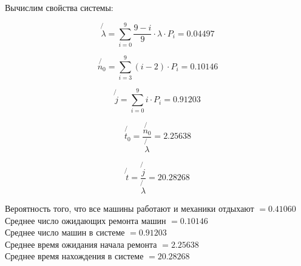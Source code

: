 Вычислим свойства системы:

\begin{equation*}
	\not{\lambda} = \sum_{i = 0}^9 \frac{9 - i}{9} \cdot \lambda \cdot P_i = 0.04497
\end{equation*}

\begin{equation*}
	\not{n_0} = \sum_{i = 3}^9 (i - 2) \cdot P_i = 0.10146
\end{equation*}

\begin{equation*}
	\not{j} = \sum_{i = 0}^9 i \cdot P_i = 0.91203
\end{equation*}

\begin{equation*}
	\not{t_0} = \frac{\not{n_0}}{\not{\lambda}} = 2.25638
\end{equation*}

\begin{equation*}
	\not{t} = \frac{\not{j}}{\not{\lambda}} = 20.28268
\end{equation*}

\noindent Вероятность того, что все машины работают и механики отдыхают $= 0.41060$\\
Среднее число ожидающих ремонта машин $= 0.10146$\\
Среднее число машин в системе $= 0.91203$\\
Среднее время ожидания начала ремонта $= 2.25638$\\
Среднее время нахождения в системе $= 20.28268$\\

